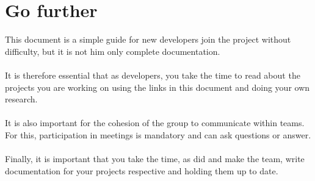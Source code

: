 \documentclass{life-fr}
\begin{document}
\chapter{Go further}

This document is a simple guide for new developers
join the project without difficulty, but it is not him
only complete documentation.\\
\\
It is therefore essential that as developers, you take the time
to read about the projects you are working on using
the links in this document and doing your own research.\\
\\
It is also important for the cohesion of the group to communicate
within teams. For this, participation in meetings is mandatory
and can ask questions or answer.\\
\\
Finally, it is important that you take the time, as did
and make the team, write documentation for your projects
respective and holding them up to date.
\end{document}
